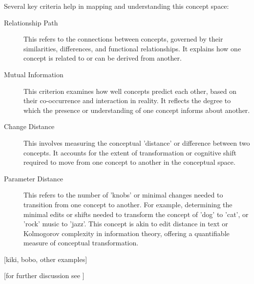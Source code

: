 Several key criteria help in mapping and understanding this concept space:

\begin{description}
    \item [Relationship Path] This refers to the connections between concepts, governed by their similarities, differences, and functional relationships. It explains how one concept is related to or can be derived from another.
    \item [Mutual Information] This criterion examines how well concepts predict each other, based on their co-occurrence and interaction in reality. It reflects the degree to which the presence or understanding of one concept informs about another.
    \item [Change Distance] This involves measuring the conceptual 'distance' or difference between two concepts. It accounts for the extent of transformation or cognitive shift required to move from one concept to another in the conceptual space.
    \item [Parameter Distance] This refers to the number of 'knobs' or minimal changes needed to transition from one concept to another. For example, determining the minimal edits or shifts needed to transform the concept of 'dog' to 'cat', or 'rock' music to 'jazz'. This concept is akin to edit distance in text or Kolmogorov complexity in information theory, offering a quantifiable measure of conceptual transformation.
\end{description}


[kiki, bobo, other examples]

[for further discussion see ]


\subsubsection{}\label{sec:llm}


